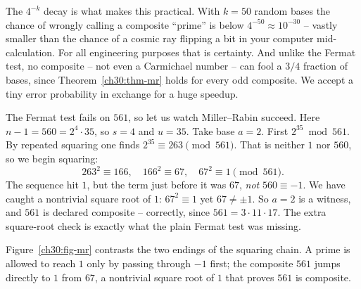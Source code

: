 \begin{intuitionbox}
The $4^{-k}$ decay is what makes this practical. With $k = 50$ random bases the
chance of wrongly calling a composite ``prime'' is below $4^{-50} \approx
10^{-30}$ -- vastly smaller than the chance of a cosmic ray flipping a bit in
your computer mid-calculation. For all engineering purposes that is certainty.
And unlike the Fermat test, no composite -- not even a Carmichael number -- can
fool a $3/4$ fraction of bases, since Theorem~\ref{ch30:thm-mr} holds for every
odd composite. We accept a tiny error probability in exchange for a huge speedup.
\end{intuitionbox}

\begin{example}[Catching $n = 561$, the smallest Carmichael number]
\label{ch30:ex-mr}
The Fermat test fails on $561$, so let us watch Miller--Rabin succeed. Here
$n - 1 = 560 = 2^{4}\cdot 35$, so $s = 4$ and $u = 35$. Take base $a = 2$.
First $2^{35} \bmod 561$. By repeated squaring one finds $2^{35} \equiv 263
\pmod{561}$. That is neither $1$ nor $560$, so we begin squaring:
\[
  263^2 \equiv 166,\quad 166^2 \equiv 67,\quad 67^2 \equiv 1 \pmod{561}.
\]
The sequence hit $1$, but the term just before it was $67$, \emph{not} $560 \equiv
-1$. We have caught a nontrivial square root of $1$: $67^2 \equiv 1$ yet $67 \neq
\pm 1$. So $a = 2$ is a witness, and $561$ is declared composite -- correctly,
since $561 = 3 \cdot 11 \cdot 17$. The extra square-root check is exactly what the
plain Fermat test was missing.
\end{example}

Figure~\ref{ch30:fig-mr} contrasts the two endings of the squaring chain. A
prime is allowed to reach $1$ only by passing through $-1$ first; the composite
$561$ jumps directly to $1$ from $67$, a nontrivial square root of $1$ that proves $561$ is composite.

